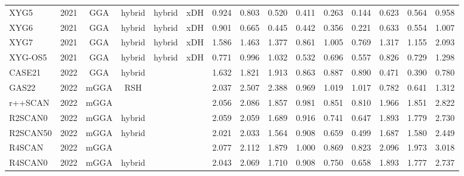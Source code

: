 \begin{landscape}
\begin{longtable}{ll:cccc:rrr:rrr:rrr}
    XYG5             & 2021 & GGA  & hybrid   & hybrid      & xDH       & 0.924             & 0.803             & 0.520  & 0.411              & 0.263             & 0.144  & 0.623   & 0.564 & 0.958 \\
    XYG6             & 2021 & GGA  & hybrid   & hybrid      & xDH       & 0.901             & 0.665             & 0.445  & 0.442              & 0.356             & 0.221  & 0.633   & 0.554 & 1.007 \\
    XYG7             & 2021 & GGA  & hybrid   & hybrid      & xDH       & 1.586             & 1.463             & 1.377  & 0.861              & 1.005             & 0.769  & 1.317   & 1.155 & 2.093 \\
    XYG-OS5          & 2021 & GGA  & hybrid   & hybrid      & xDH       & 0.771             & 0.996             & 1.032  & 0.532              & 0.696             & 0.557  & 0.826   & 0.729 & 1.298 \\
    CASE21           & 2022 & GGA  & hybrid   &             &           & 1.632             & 1.821             & 1.913  & 0.863              & 0.887             & 0.890  & 0.471   & 0.390 & 0.780 \\
    GAS22            & 2022 & mGGA & RSH      &             &           & 2.037             & 2.507             & 2.388  & 0.969              & 1.019             & 1.017  & 0.782   & 0.641 & 1.312 \\
    r++SCAN          & 2022 & mGGA &          &             &           & 2.056             & 2.086             & 1.857  & 0.981              & 0.851             & 0.810  & 1.966   & 1.851 & 2.822 \\
    R2SCAN0          & 2022 & mGGA & hybrid   &             &           & 2.059             & 2.059             & 1.689  & 0.916              & 0.741             & 0.647  & 1.893   & 1.779 & 2.730 \\
    R2SCAN50         & 2022 & mGGA & hybrid   &             &           & 2.021             & 2.033             & 1.564  & 0.908              & 0.659             & 0.499  & 1.687   & 1.580 & 2.449 \\
    R4SCAN           & 2022 & mGGA &          &             &           & 2.077             & 2.112             & 1.879  & 1.000              & 0.869             & 0.823  & 2.096   & 1.973 & 3.018 \\
    R4SCAN0          & 2022 & mGGA & hybrid   &             &           & 2.043             & 2.069             & 1.710  & 0.908              & 0.750             & 0.658  & 1.893   & 1.777 & 2.737
\end{longtable}

\end{landscape}
